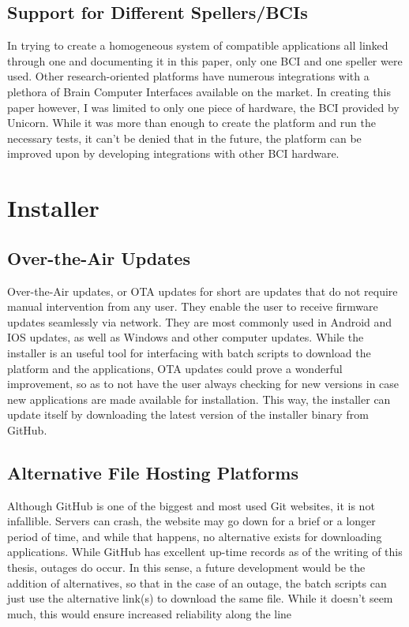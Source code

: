 \subsection{Support for Different Spellers/BCIs}
In trying to create a homogeneous system of compatible applications all linked through one and documenting it in this paper, only one BCI and one speller were used. Other research-oriented platforms have numerous integrations with a plethora of Brain Computer Interfaces available on the market. In creating this paper however, I was limited to only one piece of hardware, the BCI provided by Unicorn. While it was more than enough to create the platform and run the necessary tests, it can't be denied that in the future, the platform can be improved upon by developing integrations with other BCI hardware.



\section{Installer}
\subsection{Over-the-Air Updates}
Over-the-Air updates, or OTA updates for short are updates that do not require manual intervention from any user. They enable the user to receive firmware updates seamlessly via network. They are most commonly used in Android and IOS updates, as well as Windows and other computer updates.
\vspace{\baselineskip}\newline
While the installer is an useful tool for interfacing with batch scripts to download the platform and the applications, OTA updates could prove a wonderful improvement, so as to not have the user always checking for new versions in case new applications are made available for installation. This way, the installer can update itself by downloading the latest version of the installer binary from GitHub.

\subsection{Alternative File Hosting Platforms}
Although GitHub is one of the biggest and most used Git websites, it is not infallible. Servers can crash, the website may go down for a brief or a longer period of time, and while that happens, no alternative exists for downloading applications. While GitHub has excellent up-time records as of the writing of this thesis, outages do occur. In this sense, a future development would be the addition of alternatives, so that in the case of an outage, the batch scripts can just use the alternative link(s) to download the same file. While it doesn't seem much, this would ensure increased reliability along the line 
